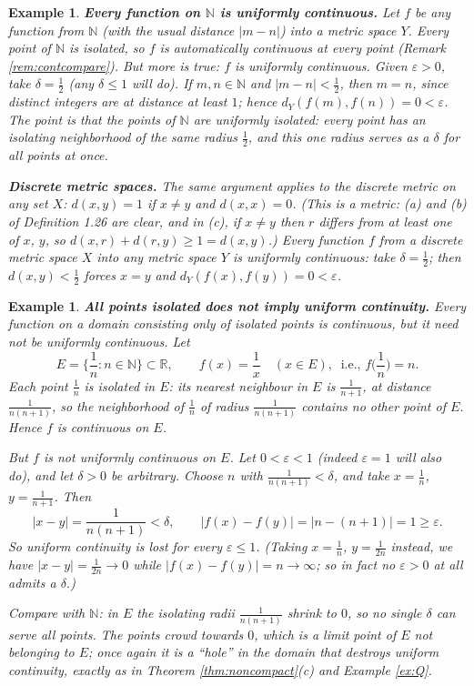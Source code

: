 \documentclass{article}
\theoremstyle{mythm}
\newtheorem{example}[theorem]{Example}
\begin{document}
\begin{example}\label{ex:N}
\textbf{Every function on $\mathbb{N}$ is uniformly continuous.} Let $f$ be any function from $\mathbb{N}$ (with the usual distance $|m - n|$) into a metric space $Y$. Every point of $\mathbb{N}$ is isolated, so $f$ is automatically continuous at every point (Remark \ref{rem:contcompare}). But more is true: $f$ is uniformly continuous. Given $\varepsilon > 0$, take $\delta = \frac{1}{2}$ (any $\delta \leq 1$ will do). If $m, n \in \mathbb{N}$ and $|m - n| < \frac{1}{2}$, then $m = n$, since distinct integers are at distance at least $1$; hence $d_Y(f(m), f(n)) = 0 < \varepsilon$. The point is that the points of $\mathbb{N}$ are \textit{uniformly} isolated: every point has an isolating neighborhood of the \textit{same} radius $\frac{1}{2}$, and this one radius serves as a $\delta$ for all points at once.

\textbf{Discrete metric spaces.} The same argument applies to the \textit{discrete metric} on any set $X$: $d(x,y) = 1$ if $x \neq y$ and $d(x,x) = 0$. (This is a metric: (a) and (b) of Definition 1.26 are clear, and in (c), if $x \neq y$ then $r$ differs from at least one of $x$, $y$, so $d(x,r) + d(r,y) \geq 1 = d(x,y)$.) Every function $f$ from a discrete metric space $X$ into any metric space $Y$ is uniformly continuous: take $\delta = \frac{1}{2}$; then $d(x,y) < \frac12$ forces $x = y$ and $d_Y(f(x), f(y)) = 0 < \varepsilon$.
\end{example}

\begin{example}\label{ex:1overn}
\textbf{All points isolated does not imply uniform continuity.} Every function on a domain consisting only of isolated points is continuous, but it need not be uniformly continuous. Let
\[
E = \Big\{ \frac{1}{n} : n \in \mathbb{N} \Big\} \subset \mathbb{R}, \qquad f(x) = \frac{1}{x} \quad (x \in E), \ \text{ i.e., } f\Big(\frac{1}{n}\Big) = n.
\]
Each point $\frac{1}{n}$ is isolated in $E$: its nearest neighbour in $E$ is $\frac{1}{n+1}$, at distance $\frac{1}{n(n+1)}$, so the neighborhood of $\frac1n$ of radius $\frac{1}{n(n+1)}$ contains no other point of $E$. Hence $f$ is continuous on $E$.

But $f$ is not uniformly continuous on $E$. Let $0 < \varepsilon < 1$ (indeed $\varepsilon = 1$ will also do), and let $\delta > 0$ be arbitrary. Choose $n$ with $\frac{1}{n(n+1)} < \delta$, and take $x = \frac{1}{n}$, $y = \frac{1}{n+1}$. Then
\[
|x - y| = \frac{1}{n(n+1)} < \delta, \qquad |f(x) - f(y)| = |n - (n+1)| = 1 \geq \varepsilon.
\]
So uniform continuity is lost for every $\varepsilon \leq 1$. (Taking $x = \frac1n$, $y = \frac{1}{2n}$ instead, we have $|x - y| = \frac{1}{2n} \to 0$ while $|f(x) - f(y)| = n \to \infty$; so in fact no $\varepsilon > 0$ at all admits a $\delta$.)

Compare with $\mathbb{N}$: in $E$ the isolating radii $\frac{1}{n(n+1)}$ shrink to $0$, so no single $\delta$ can serve all points. The points crowd towards $0$, which is a limit point of $E$ not belonging to $E$; once again it is a ``hole'' in the domain that destroys uniform continuity, exactly as in Theorem \ref{thm:noncompact}(c) and Example \ref{ex:Q}.
\end{example}
\end{document}
